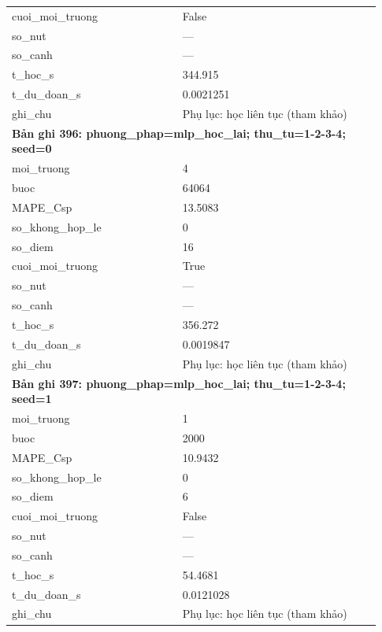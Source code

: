 \begin{longtable}{p{0.43\linewidth}p{0.50\linewidth}}
cuoi\_\allowbreak moi\_\allowbreak truong & False \\
so\_\allowbreak nut & — \\
so\_\allowbreak canh & — \\
t\_\allowbreak hoc\_\allowbreak s & 344.915 \\
t\_\allowbreak du\_\allowbreak doan\_\allowbreak s & 0.0021251 \\
ghi\_\allowbreak chu & Phụ lục: học liên tục (tham khảo) \\
\midrule
\multicolumn{2}{p{0.95\linewidth}}{\textbf{Bản ghi 396: phuong\_phap=mlp\_hoc\_lai; thu\_tu=1-2-3-4; seed=0}} \\
moi\_\allowbreak truong & 4 \\
buoc & 64064 \\
MAPE\_\allowbreak Csp & 13.5083 \\
so\_\allowbreak khong\_\allowbreak hop\_\allowbreak le & 0 \\
so\_\allowbreak diem & 16 \\
cuoi\_\allowbreak moi\_\allowbreak truong & True \\
so\_\allowbreak nut & — \\
so\_\allowbreak canh & — \\
t\_\allowbreak hoc\_\allowbreak s & 356.272 \\
t\_\allowbreak du\_\allowbreak doan\_\allowbreak s & 0.0019847 \\
ghi\_\allowbreak chu & Phụ lục: học liên tục (tham khảo) \\
\midrule
\multicolumn{2}{p{0.95\linewidth}}{\textbf{Bản ghi 397: phuong\_phap=mlp\_hoc\_lai; thu\_tu=1-2-3-4; seed=1}} \\
moi\_\allowbreak truong & 1 \\
buoc & 2000 \\
MAPE\_\allowbreak Csp & 10.9432 \\
so\_\allowbreak khong\_\allowbreak hop\_\allowbreak le & 0 \\
so\_\allowbreak diem & 6 \\
cuoi\_\allowbreak moi\_\allowbreak truong & False \\
so\_\allowbreak nut & — \\
so\_\allowbreak canh & — \\
t\_\allowbreak hoc\_\allowbreak s & 54.4681 \\
t\_\allowbreak du\_\allowbreak doan\_\allowbreak s & 0.0121028 \\
ghi\_\allowbreak chu & Phụ lục: học liên tục (tham khảo) \\

\end{longtable}
